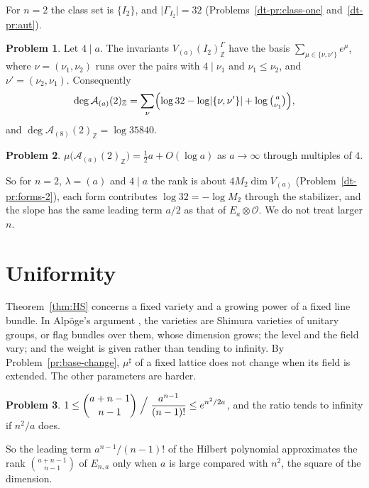 \documentclass[reqno]{amsart}
\theoremstyle{definition}
\newtheorem{problem}{Problem}[section]
\theoremstyle{plain}
\newcommand{\Z}{\mathbb{Z}}
\newcommand{\Oc}{\mathcal{O}}
\newcommand{\Ac}{\mathcal{A}}
\begin{document}
For \(n = 2\) the class set is \(\{I_2\}\), and \(\lvert\Gamma_{I_2}\rvert = 32\) (Problems~\ref{dt-pr:class-one} and~\ref{dt-pr:aut}).

\begin{problem}\label{pr:def-n2}
Let \(4 \mid a\).  The invariants \(V_{(a)}(I_2)_\Z^{\Gamma}\) have the basis \(\sum_{\mu \in \{\nu, \nu'\}} e^\mu\), where \(\nu = (\nu_1, \nu_2)\) runs over the pairs with \(4 \mid \nu_1\) and \(\nu_1 \le \nu_2\), and \(\nu' = (\nu_2, \nu_1)\).  Consequently
\[
  \deg \Ac_{(a)}(2)_\Z = \sum_{\nu} \Bigl( \log 32 - \log\lvert\{\nu, \nu'\}\rvert + \log\tbinom{a}{\nu_1} \Bigr),
\]
and \(\deg\Ac_{(8)}(2)_\Z = \log 35840\).
\end{problem}

\begin{problem}\label{pr:def-n2-asym}
\(\mu\bigl(\Ac_{(a)}(2)_\Z\bigr) = \tfrac12 a + O(\log a)\) as \(a \to \infty\) through multiples of \(4\).
\end{problem}

So for \(n = 2\), \(\lambda = (a)\) and \(4 \mid a\) the rank is about \(4M_2\dim V_{(a)}\) (Problem~\ref{dt-pr:forms-2}), each form contributes \(\log 32 = -\log M_2\) through the stabilizer, and the slope has the same leading term \(a/2\) as that of \(E_a \otimes \Oc\).  We do not treat larger \(n\).

\section{Uniformity}\label{sec:uniform}

Theorem~\ref{thm:HS} concerns a fixed variety and a growing power of a fixed line bundle.  In Alpöge's argument \cite{Alp}, \cite{Zh} the varieties are Shimura varieties of unitary groups, or flag bundles over them, whose dimension grows; the level and the field vary; and the weight is given rather than tending to infinity.  By Problem~\ref{pr:base-change}, \(\mu^\sharp\) of a fixed lattice does not change when its field is extended.  The other parameters are harder.

\begin{problem}\label{pr:rank-ratio}
\(\displaystyle 1 \le \binom{a+n-1}{n-1} \Bigm/ \frac{a^{n-1}}{(n-1)!} \le e^{n^2/2a}\), and the ratio tends to infinity if \(n^2/a\) does.
\end{problem}

So the leading term \(a^{n-1}/(n-1)!\) of the Hilbert polynomial approximates the rank \(\binom{a+n-1}{n-1}\) of \(E_{n,a}\) only when \(a\) is large compared with \(n^2\), the square of the dimension.
\end{document}
